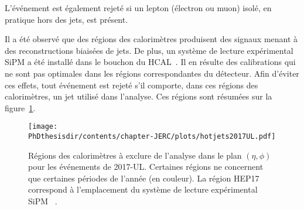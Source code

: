 L'événement est également rejeté si un lepton (électron ou muon) isolé, en pratique hors des jets, est présent.
\par Il a été observé que des régions des calorimètres produisent des signaux menant à des reconstructions biaisées de jets.
De plus, un système de lecture expérimental \og SiPM \fg{} a été installé dans le bouchon du HCAL~\cite{SiPM_CMS_conf}.
Il en résulte des calibrations qui ne sont pas optimales dans les régions correspondantes du détecteur.
Afin d'éviter ces effets, tout événement est rejeté s'il comporte, dans ces régions des calorimètres, un jet utilisé dans l'analyse.
Ces régions sont résumées sur la figure~\ref{fig-hotjets2017UL}.
\begin{figure}[h]
\centering
\texttt{[image: \\PhDthesisdir/contents/chapter-JERC/plots/hotjets2017UL.pdf]}
\caption[Régions des calorimètres à exclure de l'analyse dans le plan $(\eta, \phi)$.]{Régions des calorimètres à exclure de l'analyse dans le plan $(\eta, \phi)$ pour les événements de 2017-UL. Certaines régions ne concernent que certaines périodes de l'année (en couleur). La région \og HEP17 \fg{} correspond à l'emplacement du système de lecture expérimental \og SiPM \fg~\cite{SiPM_CMS_conf}.}
\label{fig-hotjets2017UL}
\end{figure}
%
%
%
